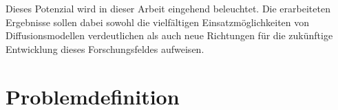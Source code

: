 Dieses Potenzial wird in dieser Arbeit eingehend beleuchtet. Die erarbeiteten Ergebnisse sollen dabei sowohl die vielfältigen Einsatzmöglichkeiten von Diffusionsmodellen verdeutlichen als auch neue Richtungen für die zukünftige Entwicklung dieses Forschungsfeldes aufweisen.


\section{Problemdefinition}

